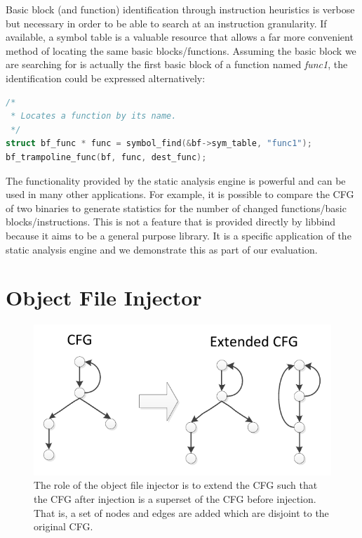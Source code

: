 Basic block (and function) identification through instruction heuristics is verbose but necessary in order to be able to search at an instruction granularity. If available, a symbol table is a valuable resource that allows a far more convenient method of locating the same basic blocks/functions. Assuming the basic block we are searching for is actually the first basic block of a function named \emph{func1}, the identification could be expressed alternatively:

\begin{lstlisting}[language=C,caption={Identifying basic blocks via symbols}]
/*
 * Locates a function by its name.
 */
struct bf_func * func = symbol_find(&bf->sym_table, "func1");
bf_trampoline_func(bf, func, dest_func);
\end{lstlisting}

The functionality provided by the static analysis engine is powerful and can be used in many other applications. For example, it is possible to compare the CFG of two binaries to generate statistics for the number of changed functions/basic blocks/instructions. This is not a feature that is provided directly by libbind because it aims to be a general purpose library. It is a specific application of the static analysis engine and we demonstrate this as part of our evaluation.

\section{Object File Injector}

\begin{figure}[H]
 \centering
 \includegraphics{Object_File_Injector.pdf}
 \caption[Object File Injector]{The role of the object file injector is to extend the CFG such that the CFG after injection is a superset of the CFG before injection. That is, a set of nodes and edges are added which are disjoint to the original CFG.}
\end{figure}

